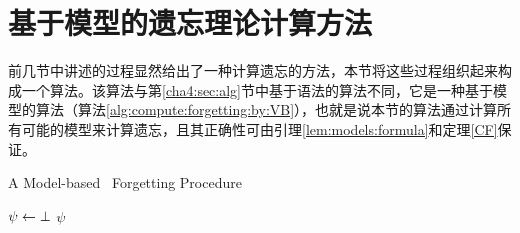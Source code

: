 %	
%	
%	


\section{基于模型的遗忘理论计算方法}\label{chapter06:sec:algm}
前几节中讲述的过程显然给出了一种计算遗忘的方法，本节将这些过程组织起来构成一个算法。该算法与第\ref{cha4:sec:alg}节中基于语法的算法不同，它是一种基于模型的算法（算法\ref{alg:compute:forgetting:by:VB}），也就是说本节的算法通过计算所有可能的模型来计算遗忘，且其正确性可由引理\ref{lem:models:formula}和定理\ref{CF}保证。


\begin{algorithm}[tb]
	\caption{\small A Model-based \CTL\ Forgetting Procedure}
	\label{alg:compute:forgetting:by:VB}
	\LinesNumbered
	$\psi \leftarrow \bot$\;
	\Return $\psi$\;
\end{algorithm}



